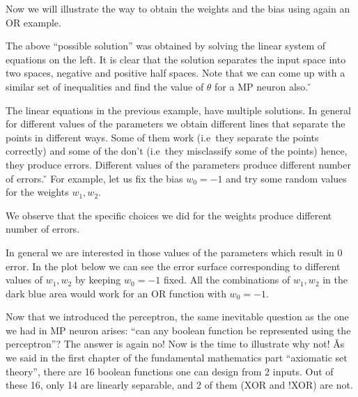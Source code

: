 \be
Now we will illustrate the way to obtain the weights and the bias using again an OR example.


\vspace{-5pt}

The above ``possible solution'' was obtained by solving the linear system of equations on the left. It is clear that
the solution separates the input space into two spaces, negative and positive half spaces. Note that we can come up
with a similar set of inequalities and find the value of $\theta$ for a MP neuron also. \v
\ee

The linear equations in the previous example, have multiple solutions. In general for different values of the
parameters we obtain different lines that separate the points in different ways. Some of them work (i.e\ they
separate the points correctly) and some of the don't (i.e\ they misclassify some of the points) hence, they produce
errors. Different values of the parameters produce different number of errors. \v

\be
For example, let us fix the bias $w_0 = -1$ and try some random values for the weights $w_1, w_2$.


We observe that the specific choices we did for the weights produce different number of errors.


\vspace{-5pt}

In general we are interested in those values of the parameters which result in 0 error. In the plot below we can see
the error surface corresponding to different values of $w_1, w_2$ by keeping $w_0 = -1$ fixed. All the combinations
of $w_1, w_2$ in the dark blue area would work for an OR function with $w_0 = -1$.


\ee

Now that we introduced the perceptron, the same inevitable question as the one we had in MP neuron arises: ``can any
boolean function be represented using the perceptron''? The answer is again no! Now is the time to illustrate why
not! \v

As we said in the first chapter of the fundamental mathematics part ``axiomatic set theory'', there are 16 boolean
functions one can design from 2 inputs. Out of these 16, only 14 are linearly separable, and 2 of them (XOR and !XOR)
are not.

